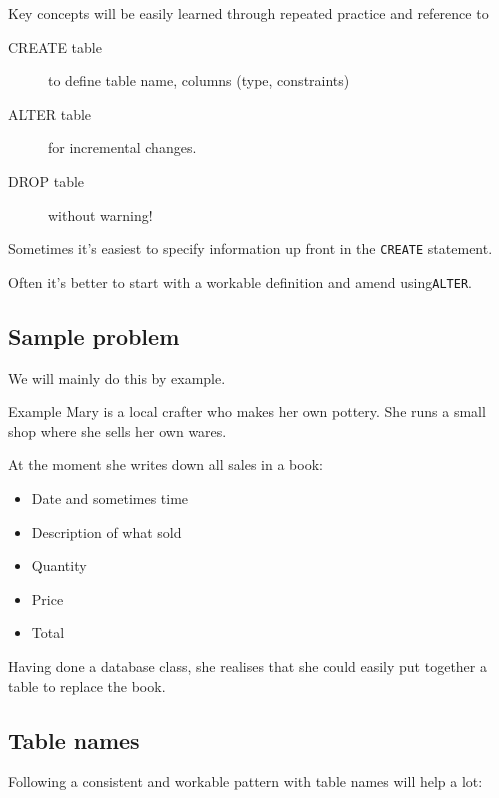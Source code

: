 \documentclass[slides]{pgnotes}
\begin{document}
Key concepts will be easily learned through repeated practice and
reference to

\begin{description}
\item[CREATE table]
  to define table name, columns (type, constraints)
\item[ALTER table]
  for incremental changes.
\item[DROP table]
  without warning!
\end{description}

Sometimes it's easiest to specify information up front in the \texttt{CREATE} statement.

Often it's better to start with a workable definition and amend using\texttt{ALTER}.

\subsection{Sample problem}

We will mainly do this by example.

\begin{greenbox}{Example}
  Mary is a local crafter who makes her own pottery.
  She runs a small shop where she sells her own wares.

  At the moment she writes down all sales in a book:
  \begin{itemize}
  \item Date and sometimes time
  \item Description of what sold
  \item Quantity
  \item Price
  \item Total
  \end{itemize}

  Having done a database class, she realises that she could easily put together a table to replace the book.
\end{greenbox}

\subsection{Table names}

Following a consistent and workable pattern with table names will help a lot:
\end{document}
